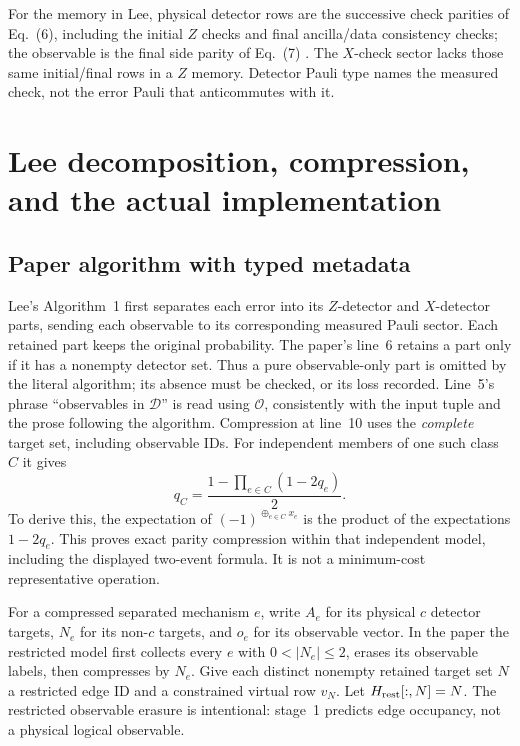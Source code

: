 For the memory in Lee, physical detector rows are the successive check
parities of Eq.\ (6), including the initial $Z$ checks and final ancilla/data
consistency checks; the observable is the final side parity of Eq.\ (7)
\cite[Sec.~4.1]{Lee}. The $X$-check sector lacks those same initial/final
rows in a $Z$ memory. Detector Pauli type names the measured check, not
the error Pauli that anticommutes with it.

\section{Lee decomposition, compression, and the actual implementation}
\label{sec:cl-decomp}
\subsection{Paper algorithm with typed metadata}
Lee's Algorithm~1 first separates each error into its $Z$-detector and
$X$-detector parts, sending each observable to its corresponding measured
Pauli sector. Each retained part keeps the original probability. The
paper's line~6 retains a part only if it has a nonempty detector set.
Thus a pure observable-only part is omitted by the literal algorithm;
its absence must be checked, or its loss recorded. Line~5's phrase
``observables in $\mathcal D$'' is read using $\mathcal O$, consistently
with the input tuple and the prose following the algorithm.
Compression at line~10 uses the \emph{complete} target set, including
observable IDs. For independent members of one such class $C$ it gives
\begin{equation}
 q_C=\frac{1-\prod_{e\in C}(1-2q_e)}2.
 \label{eq:cl-compression}
\end{equation}
To derive this, the expectation of $(-1)^{\oplus_{e\in C}x_e}$ is the
product of the expectations $1-2q_e$. This proves exact parity compression
within that independent model, including the displayed two-event formula.
It is not a minimum-cost representative operation.

For a compressed separated mechanism $e$, write $A_e$ for its physical
$c$ detector targets, $N_e$ for its non-$c$ targets, and $o_e$ for its
observable vector. In the paper the restricted model first collects every
$e$ with $0<|N_e|\le2$, erases its observable labels, then compresses by
$N_e$. Give each distinct nonempty retained target set $N$ a restricted
edge ID and a constrained virtual row $v_N$. Let $H_{\rm rest}[:,N]=N$.
The restricted observable erasure is intentional: stage~1 predicts edge
occupancy, not a physical logical observable.

